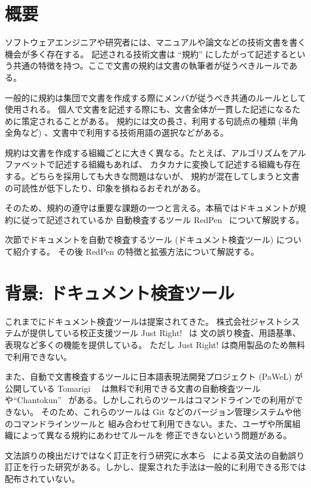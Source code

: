 \section{概要}

ソフトウェアエンジニアや研究者には、マニュアルや論文などの技術文書を書く機会が多く存在する。
記述される技術文書は ``規約'' にしたがって記述するという共通の特徴を持つ。ここで文書の規約は文書の執筆者が従うべきルールである。

一般的に規約は集団で文書を作成する際にメンバが従うべき共通のルールとして使用される。
個人で文書を記述する際にも、文書全体が一貫した記述になるために策定されることがある。
規約には文の長さ、利用する句読点の種類 (半角全角など) 、文書中で利用する技術用語の選択などがある。

規約は文書を作成する組織ごとに大きく異なる。たとえば、アルゴリズムをアルファベットで記述する組織もあれば、
カタカナに変換して記述する組織も存在する。どちらを採用しても大きな問題はないが、
規約が混在してしまうと文書の可読性が低下したり、印象を損ねるおそれがある。

そのため、規約の遵守は重要な課題の一つと言える。本稿ではドキュメントが規約に従って記述されているか
自動検査するツール RedPen~\cite{redpen}\cite{ito15repden} について解説する。

次節でドキュメントを自動で検査するツール (ドキュメント検査ツール) について紹介する。
その後 RedPen の特徴と拡張方法について解説する。

\section{背景: ドキュメント検査ツール}
これまでにドキュメント検査ツールは提案されてきた。
株式会社ジャストシステムが提供している校正支援ツール Just Right!~\cite{justright} は
文の誤り検査、用語基準、表現など多くの機能を提供している。
ただし Just Right! は商用製品のため無料で利用できない。

また、自動で文書検査するツールに日本語表現法開発プロジェクト (PaWeL) が公開している
 Tomarigi~\cite{tomarigi}~\cite{tomarigi-paper} は無料で利用できる文書の自動検査ツール
や``Chantokun''~\cite{chantokun} がある。しかしこれらのツールはコマンドラインでの利用ができない。
そのため、これらのツールは Git などのバージョン管理システムや他のコマンドラインツールと
組み合わせて利用できない。また、ユーザや所属組織によって異なる規約にあわせてルールを
修正できないという問題がある。

文法誤りの検出だけではなく訂正を行う研究に水本ら~\cite{mizumoto12english} による英文法の自動誤り
訂正を行った研究がある。しかし、提案された手法は一般的に利用できる形では配布されていない。

